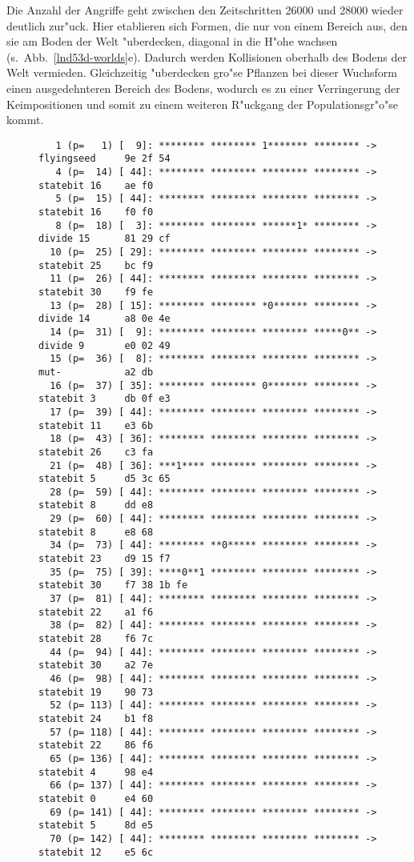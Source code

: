 Die Anzahl der Angriffe geht zwischen den Zeitschritten 26000 und 28000 wieder deutlich zur"uck. Hier etablieren sich Formen,
die nur von einem Bereich aus, den sie am Boden der Welt "uberdecken, diagonal in die H"ohe wachsen (s.\ Abb.\ \ref{lnd53d-worlds}e).
Dadurch werden Kollisionen oberhalb des Bodens der Welt vermieden. Gleichzeitig "uberdecken gro"se Pflanzen bei dieser Wuchsform
einen ausgedehnteren Bereich des Bodens, wodurch es zu einer Verringerung der Keimpositionen und somit zu einem weiteren R"uckgang
der Populationsgr"o"se kommt.


\begin{figure}[t]
{
\scriptsize
\begin{verbatim}
   1 (p=   1) [  9]: ******** ******** 1******* ******** -> flyingseed     9e 2f 54
   4 (p=  14) [ 44]: ******** ******** ******** ******** -> statebit 16    ae f0
   5 (p=  15) [ 44]: ******** ******** ******** ******** -> statebit 16    f0 f0
   8 (p=  18) [  3]: ******** ******** ******1* ******** -> divide 15      81 29 cf
  10 (p=  25) [ 29]: ******** ******** ******** ******** -> statebit 25    bc f9
  11 (p=  26) [ 44]: ******** ******** ******** ******** -> statebit 30    f9 fe
  13 (p=  28) [ 15]: ******** ******** *0****** ******** -> divide 14      a8 0e 4e
  14 (p=  31) [  9]: ******** ******** ******** *****0** -> divide 9       e0 02 49
  15 (p=  36) [  8]: ******** ******** ******** ******** -> mut-           a2 db
  16 (p=  37) [ 35]: ******** ******** 0******* ******** -> statebit 3     db 0f e3
  17 (p=  39) [ 44]: ******** ******** ******** ******** -> statebit 11    e3 6b
  18 (p=  43) [ 36]: ******** ******** ******** ******** -> statebit 26    c3 fa
  21 (p=  48) [ 36]: ***1**** ******** ******** ******** -> statebit 5     d5 3c 65
  28 (p=  59) [ 44]: ******** ******** ******** ******** -> statebit 8     dd e8
  29 (p=  60) [ 44]: ******** ******** ******** ******** -> statebit 8     e8 68
  34 (p=  73) [ 44]: ******** **0***** ******** ******** -> statebit 23    d9 15 f7
  35 (p=  75) [ 39]: ****0**1 ******** ******** ******** -> statebit 30    f7 38 1b fe
  37 (p=  81) [ 44]: ******** ******** ******** ******** -> statebit 22    a1 f6
  38 (p=  82) [ 44]: ******** ******** ******** ******** -> statebit 28    f6 7c
  44 (p=  94) [ 44]: ******** ******** ******** ******** -> statebit 30    a2 7e
  46 (p=  98) [ 44]: ******** ******** ******** ******** -> statebit 19    90 73
  52 (p= 113) [ 44]: ******** ******** ******** ******** -> statebit 24    b1 f8
  57 (p= 118) [ 44]: ******** ******** ******** ******** -> statebit 22    86 f6
  65 (p= 136) [ 44]: ******** ******** ******** ******** -> statebit 4     98 e4
  66 (p= 137) [ 44]: ******** ******** ******** ******** -> statebit 0     e4 60
  69 (p= 141) [ 44]: ******** ******** ******** ******** -> statebit 5     8d e5
  70 (p= 142) [ 44]: ******** ******** ******** ******** -> statebit 12    e5 6c
\end{verbatim}
}


\end{figure}
